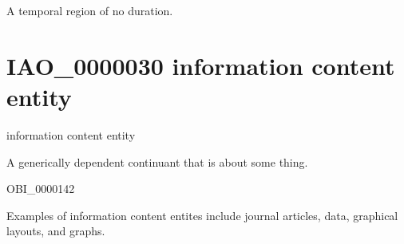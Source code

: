 \documentclass[letterpaper,10pt,english]{sphinxmanual}
\begin{document}
\begin{sphinxShadowBox}

\sphinxAtStartPar
A temporal region of no duration.
\end{sphinxShadowBox}

\begin{sphinxShadowBox}

\sphinxAtStartPar
{}
\end{sphinxShadowBox}
\begin{quote}
\label{\detokenize{doc-IAO_0000030:iao-0000030}}\label{\detokenize{doc-IAO_0000030:information-content-entity}}\label{\detokenize{doc-IAO_0000030:iao-0000030}}
\ignorespaces \end{quote}


\section{IAO\_0000030 \sphinxhyphen{} information content entity}
\label{\detokenize{doc-IAO_0000030:iao-0000030-information-content-entity}}\label{\detokenize{doc-IAO_0000030:index-0}}\label{\detokenize{doc-IAO_0000030::doc}}
\begin{sphinxShadowBox}

\sphinxAtStartPar
information content entity
\end{sphinxShadowBox}

\begin{sphinxShadowBox}

\sphinxAtStartPar
A generically dependent continuant that is about some thing.
\end{sphinxShadowBox}

\begin{sphinxShadowBox}

\sphinxAtStartPar
OBI\_0000142
\end{sphinxShadowBox}

\begin{sphinxShadowBox}

\sphinxAtStartPar
Examples of information content entites include journal articles, data, graphical layouts, and graphs.
\end{sphinxShadowBox}
\end{document}
